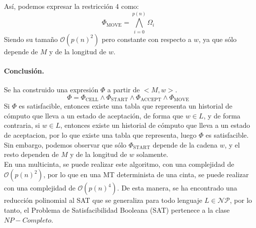 \documentclass[a4paper]{article}
\begin{document}
Así, podemos expresar la restricción 4 como:
$$\Phi_{\text{MOVE}}=\bigwedge_{i=0}^{p(n)}\Omega_i$$
Siendo su tamaño $\mathcal{O}(p(n)^2)$ pero constante con respecto a $w$, ya que sólo depende de $M$ y de la longitud de $w$.

\paragraph{Conclusión.}
Se ha construido una expresión $\Phi$ a partir de $<M,w>$.
$$\Phi = \Phi_{\text{CELL}} \land \Phi_{\text{START}} \land \Phi_{\text{ACCEPT}} \land \Phi_{\text{MOVE}}$$
Si $\Phi$ es satisfacible, entonces existe una tabla que representa un historial de cómputo que lleva a un estado de aceptación, de forma que $w \in L$, y de forma contraria, si $w \in L$, entonces existe un historial de cómputo que lleva a un estado de aceptacion, por lo que existe una tabla que representa, luego $\Phi$ es satisfacible.
Sin embargo, podemos observar que sólo $\Phi_{\text{START}}$ depende de la cadena $w$, y el resto dependen de $M$ y de la longitud de $w$ solamente.\\
En una multicinta, se puede realizar este algoritmo, con una complejidad de $\mathcal{O}(p(n)^2)$, por lo que en una MT determinista de una cinta, se puede realizar con una complejidad de $\mathcal{O}(p(n)^4)$.
De esta manera, se ha encontrado una reducción polinomial al SAT que se generaliza para todo lenguaje $L \in \mathcal{NP}$, por lo tanto, el Problema de Satisfacibilidad Booleana (SAT) pertenece a la clase $NP-Completo$.




\nocite{*}


%
\end{document}
